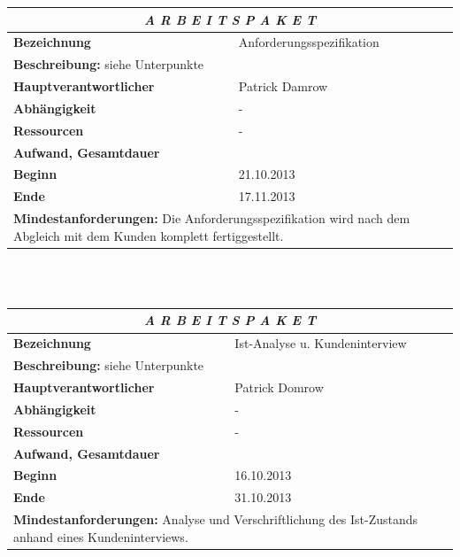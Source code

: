 \documentclass[fontsize=12pt,paper=a4,twoside]{scrartcl}
\begin{document}
\begin{tabular}{p{7.5cm}|p{7.5cm}}\toprule
\multicolumn{2}{c}{\textbf{\textit{A R B E I T S P A K E T \quad 2}}} \\ \toprule \hline
\textbf{Bezeichnung} & Anforderungsspezifikation\\\hline
\multicolumn{2}{p{15cm}}{\textbf{Beschreibung:} \newline 
siehe Unterpunkte}  \\\hline
\textbf{Hauptverantwortlicher} & Patrick Damrow \\\hline
\textbf{Abhängigkeit} & -\\\hline
\textbf{Ressourcen} & -\\\hline
\textbf{Aufwand, Gesamtdauer} & \\\hline
\textbf{Beginn} & 21.10.2013 \\\hline
\textbf{Ende} & 17.11.2013\\\hline
\multicolumn{2}{p{15cm}}{\textbf{Mindestanforderungen: } \newline
Die Anforderungsspezifikation wird nach dem Abgleich mit dem Kunden komplett fertiggestellt.}  \\ \toprule
\end{tabular} \\\\

\begin{tabular}{p{7.5cm}|p{7.5cm}}\toprule
\multicolumn{2}{c}{\textbf{\textit{A R B E I T S P A K E T \quad 2.1}}} \\ \toprule \hline
\textbf{Bezeichnung} & Ist-Analyse u. Kundeninterview\\\hline
\multicolumn{2}{p{15cm}}{\textbf{Beschreibung:} \newline 
siehe Unterpunkte}  \\\hline
\textbf{Hauptverantwortlicher} & Patrick Domrow \\\hline
\textbf{Abhängigkeit} & -\\\hline
\textbf{Ressourcen} & -\\\hline
\textbf{Aufwand, Gesamtdauer} & \\\hline
\textbf{Beginn} & 16.10.2013 \\\hline
\textbf{Ende} & 31.10.2013\\\hline
\multicolumn{2}{p{15cm}}{\textbf{Mindestanforderungen: } \newline
Analyse und Verschriftlichung des Ist-Zustands anhand eines Kundeninterviews.}  \\ \toprule
\end{tabular} \\\\
\end{document}
